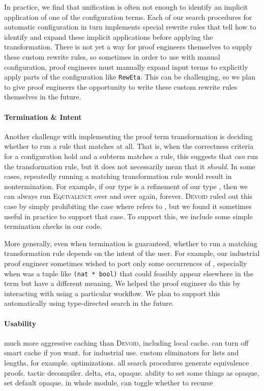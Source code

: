 In practice, we find that unification is often not enough to identify an implicit application of one of the configuration terms.
Each of our search procedures for automatic configuration in turn implements special rewrite rules that tell \toolname
how to identify and expand these implicit applications before applying the transformation.
There is not yet a way for proof engineers themselves to supply these custom rewrite rules,
so sometimes in order to use \toolname with manual configuration, proof engineers must manually expand
input terms to explicitly apply parts of the configuration like \lstinline{RewEta}.
This can be challenging, so we plan to give proof engineers the opportunity to write
these custom rewrite rules themselves in the future.

\paragraph{Termination \& Intent}

Another challenge with implementing the proof term transformation is deciding whether to run a rule that matches at all.
That is, when the correctness criteria for a configuration hold and a subterm matches a rule, this suggests that \toolname \textit{can}
run the transformation rule, but it does not necessarily mean that it \textit{should}.
In some cases, repeatedly running a matching transformation rule would result in nontermination.
For example, if our type \B is a refinement of our type \A, then we can always run \textsc{Equivalence}
over and over again, forever.
\textsc{Devoid} ruled out this case by simply prohibiting the case where \B refers to \A, but we found it sometimes
useful in practice to support that case.
To support this, we include some simple termination checks in our code.

More generally, even when termination is guaranteed, whether to run a matching transformation rule
depends on the intent of the user.
For example, our industrial proof engineer sometimes wished to port only some occurrences of \A,
especially when \A was a tuple like \lstinline{(nat * bool)} that could feasibly appear elsewhere in the term
but have a different meaning.
We helped the proof engineer do this by interacting with \toolname using a particular workflow.
We plan to support this automatically using type-directed search in the future.

\paragraph{Usability}
much more aggressive caching than \textsc{Devoid}, including local cache.
can turn off smart cache if you want.
for industrial use.
custom eliminators for lists and lengths, for example.
optimizations.
all search procedures generate equivalence proofs.
tactic decompiler.
delta, eta, opaque.
ability to set some things as opaque, set default opaque. in whole module, can toggle whether to recurse

